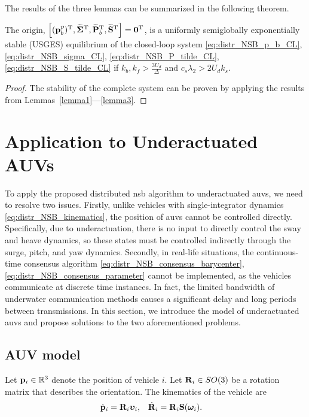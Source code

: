 The results of the three lemmas can be summarized in the following theorem.
\begin{theorem}
    \label{thm_distr_NSB}
    The origin, $\left[(\mathbf{p}_b^p)^{\mathrm{T}}, \widetilde{\bm{\Sigma}}^{\mathrm{T}}, \widetilde{\mathbf{P}}_b^{\mathrm{T}}, \widetilde{\mathbf{S}}^{\mathrm{T}}\right] = \mathbf{0}^{\mathrm{T}}$, is a uniformly semiglobally exponentially stable (USGES) equilibrium of the closed-loop system \eqref{eq:distr_NSB_p_b_CL}, \eqref{eq:distr_NSB_sigma_CL}, \eqref{eq:distr_NSB_P_tilde_CL}, \eqref{eq:distr_NSB_S_tilde_CL} if $k_b, k_f > \frac{3U_d}{\Delta}$ and $c_s \lambda_2 > 2 U_d k_s$.
\end{theorem}
\begin{proof}
    The stability of the complete system can be proven by applying the results from Lemmas~\ref{lemma1}---\ref{lemma3}.
\end{proof}

\section{Application to Underactuated AUVs}
\label{sec:distr_NSB_AUV}
To apply the proposed distributed \gls{nsb} algorithm to underactuated \glspl{auv}, we need to resolve two issues.
Firstly, unlike vehicles with single-integrator dynamics \eqref{eq:distr_NSB_kinematics}, the position of \glspl{auv} cannot be controlled directly.
Specifically, due to underactuation, there is no input to directly control the sway and heave dynamics, so these states must be controlled indirectly through the surge, pitch, and yaw dynamics.
Secondly, in real-life situations, the continuous-time consensus algorithm \eqref{eq:distr_NSB_consensus_barycenter}, \eqref{eq:distr_NSB_consensus_parameter} cannot be implemented, as the vehicles communicate at discrete time instances.
In fact, the limited bandwidth of underwater communication methods causes a significant delay and long periods between transmissions.
In this section, we introduce the model of underactuated \glspl{auv} and propose solutions to the two aforementioned problems.

\subsection{AUV model}
Let $\mathbf{p}_i \in \mathbb{R}^3$ denote the position of vehicle $i$.
Let $\mathbf{R}_i \in SO(3)$ be a rotation matrix that describes the orientation.
The kinematics of the vehicle are \cite{fossen_handbook_2011}
\begin{align}
    \dot{\mathbf{p}}_i &= \mathbf{R}_i \bm{\upsilon}_i, &
    \dot{\mathbf{R}}_i &= \mathbf{R}_i \mathbf{S}(\bm{\omega}_i).
    \label{eq:distr_NSB_AUV_kinematic}
\end{align}

